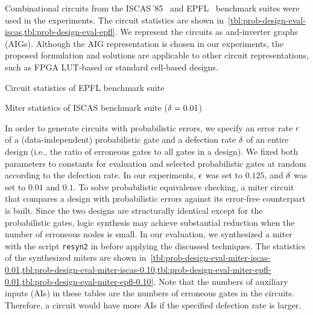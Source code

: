 Combinational circuits from the ISCAS\,'85~\cite{ISCAS85-benchmark}
and EPFL~\cite{EPFL-benchmark} benchmark suites were used in the experiments.
The circuit statistics are shown in~\cref{tbl:prob-design-eval-iscas,tbl:prob-design-eval-epfl}.
We represent the circuits as and-inverter graphs (AIGs).
Although the AIG representation is chosen in our experiments,
the proposed formulation and solutions are applicable to other circuit representations,
such as FPGA LUT-based or standard cell-based designs.

\begin{table}[hp]
    \centering
    \scriptsize
    \caption{Circuit statistics of EPFL benchmark suite}
    \label{tbl:prob-design-eval-epfl}
\end{table}

\begin{table}[ht]
    \centering
    \scriptsize
    \caption{Miter statistics of ISCAS benchmark suite ($\delta=0.01$)}
    \label{tbl:prob-design-eval-miter-iscas-0.01}
\end{table}

In order to generate circuits with probabilistic errors,
we specify an error rate $\epsilon$ of a (data-independent) probabilistic gate and
a defection rate $\delta$ of an entire design (i.e., the ratio of erroneous gates to all gates in a design).
We fixed both parameters to constants for evaluation
and selected probabilistic gates at random according to the defection rate.
In our experiments, $\epsilon$ was set to $0.125$, and $\delta$ was set to $0.01$ and $0.1$.
To solve probabilistic equivalence checking,
a miter circuit that compares a design with probabilistic errors against its error-free counterpart is built.
Since the two designs are structurally identical except for the probabilistic gates,
logic synthesis may achieve substantial reduction when the number of erroneous nodes is small.
In our evaluation,
we synthesized a miter with the script \texttt{resyn2} in \abc before applying the discussed techniques.
The statistics of the synthesized miters are shown in~\cref{tbl:prob-design-eval-miter-iscas-0.01,tbl:prob-design-eval-miter-iscas-0.10,tbl:prob-design-eval-miter-epfl-0.01,tbl:prob-design-eval-miter-epfl-0.10}.
Note that the numbers of auxiliary inputs (AIs) in these tables are the numbers of erroneous gates in the circuits.
Therefore, a circuit would have more AIs if the specified defection rate is larger.

